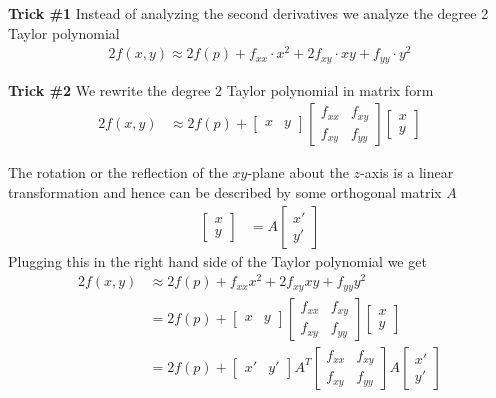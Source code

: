 \begin{description}
  \item{\bf Trick \#1} Instead of analyzing the second derivatives we analyze the degree 2 Taylor polynomial
  \begin{align*}
    2f(x,y) \approx 2f(p) + f_{xx}\cdot {x^2} + 2f_{xy} \cdot {xy} + f_{yy} \cdot {y^2}
  \end{align*}

  \item{\bf Trick \#2} We rewrite the degree 2 Taylor polynomial in matrix form
  \begin{align*}
    2f(x,y)
    &\approx 2f(p) +
    \begin{bmatrix} x & y \end{bmatrix}
    \begin{bmatrix}
      f_{xx} & f_{xy} \\
      f_{xy} & f_{yy}
    \end{bmatrix}
    \begin{bmatrix} x \\ y \end{bmatrix}
  \end{align*}
\end{description}
The rotation or the reflection of the $ xy$-plane about the $z$-axis is a linear transformation and hence can be described by some orthogonal matrix $ A$
\begin{align*}
  \begin{bmatrix} x \\ y \end{bmatrix}
    &= A
  \begin{bmatrix} x' \\ y' \end{bmatrix}
\end{align*}
Plugging this in the right hand side of the Taylor polynomial we get
\begin{align}
  \nonumber
  2f(x,y)
  &\approx 2f(p) + f_{xx}{x^2} + 2f_{xy} {xy} + f_{yy}{y^2} \\
  \nonumber
  &= 2f(p) +
  \begin{bmatrix} x & y \end{bmatrix}
  \begin{bmatrix}
    f_{xx} & f_{xy} \\
    f_{xy} & f_{yy}
  \end{bmatrix}
  \begin{bmatrix} x \\ y \end{bmatrix} \\
    \label{eq:Hessian}
    &= 2f(p) +
    \begin{bmatrix} x' & y' \end{bmatrix} A^T
    \begin{bmatrix}
      f_{xx} & f_{xy} \\
      f_{xy} & f_{yy}
    \end{bmatrix}
    A \begin{bmatrix} x' \\ y' \end{bmatrix}
\end{align}
